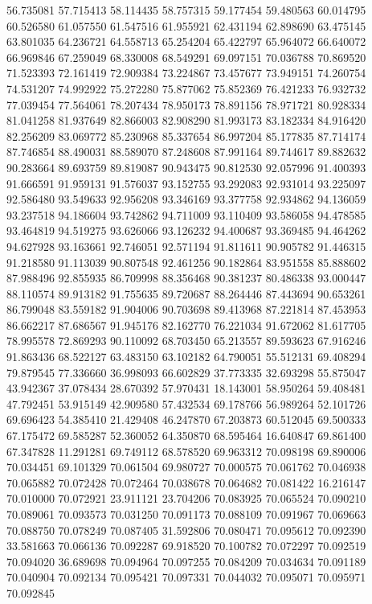 56.735081
57.715413
58.114435
58.757315
59.177454
59.480563
60.014795
60.526580
61.057550
61.547516
61.955921
62.431194
62.898690
63.475145
63.801035
64.236721
64.558713
65.254204
65.422797
65.964072
66.640072
66.969846
67.259049
68.330008
68.549291
69.097151
70.036788
70.869520
71.523393
72.161419
72.909384
73.224867
73.457677
73.949151
74.260754
74.531207
74.992922
75.272280
75.877062
75.852369
76.421233
76.932732
77.039454
77.564061
78.207434
78.950173
78.891156
78.971721
80.928334
81.041258
81.937649
82.866003
82.908290
81.993173
83.182334
84.916420
82.256209
83.069772
85.230968
85.337654
86.997204
85.177835
87.714174
87.746854
88.490031
88.589070
87.248608
87.991164
89.744617
89.882632
90.283664
89.693759
89.819087
90.943475
90.812530
92.057996
91.400393
91.666591
91.959131
91.576037
93.152755
93.292083
92.931014
93.225097
92.586480
93.549633
92.956208
93.346169
93.377758
92.934862
94.136059
93.237518
94.186604
93.742862
94.711009
93.110409
93.586058
94.478585
93.464819
94.519275
93.626066
93.126232
94.400687
93.369485
94.464262
94.627928
93.163661
92.746051
92.571194
91.811611
90.905782
91.446315
91.218580
91.113039
90.807548
92.461256
90.182864
83.951558
85.888602
87.988496
92.855935
86.709998
88.356468
90.381237
80.486338
93.000447
88.110574
89.913182
91.755635
89.720687
88.264446
87.443694
90.653261
86.799048
83.559182
91.904006
90.703698
89.413968
87.221814
87.453953
86.662217
87.686567
91.945176
82.162770
76.221034
91.672062
81.617705
78.995578
72.869293
90.110092
68.703450
65.213557
89.593623
67.916246
91.863436
68.522127
63.483150
63.102182
64.790051
55.512131
69.408294
79.879545
77.336660
36.998093
66.602829
37.773335
32.693298
55.875047
43.942367
37.078434
28.670392
57.970431
18.143001
58.950264
59.408481
47.792451
53.915149
42.909580
57.432534
69.178766
56.989264
52.101726
69.696423
54.385410
21.429408
46.247870
67.203873
60.512045
69.500333
67.175472
69.585287
52.360052
64.350870
68.595464
16.640847
69.861400
67.347828
11.291281
69.749112
68.578520
69.963312
70.098198
69.890006
70.034451
69.101329
70.061504
69.980727
70.000575
70.061762
70.046938
70.065882
70.072428
70.072464
70.038678
70.064682
70.081422
16.216147
70.010000
70.072921
23.911121
23.704206
70.083925
70.065524
70.090210
70.089061
70.093573
70.031250
70.091173
70.088109
70.091967
70.069663
70.088750
70.078249
70.087405
31.592806
70.080471
70.095612
70.092390
33.581663
70.066136
70.092287
69.918520
70.100782
70.072297
70.092519
70.094020
36.689698
70.094964
70.097255
70.084209
70.034634
70.091189
70.040904
70.092134
70.095421
70.097331
70.044032
70.095071
70.095971
70.092845
